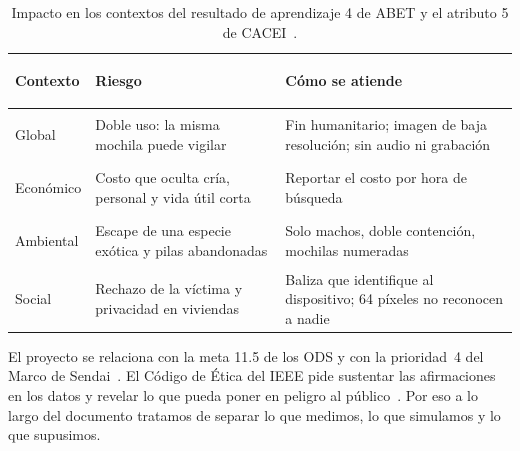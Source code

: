 \begin{table}[!htb]
\centering\footnotesize
\caption{Impacto en los contextos del resultado de aprendizaje 4 de ABET y el atributo 5 de
CACEI~\cite{abet,cacei}.}
\label{tab:impacto}
\begin{tabularx}{\textwidth}{@{}>{\bfseries\raggedright\arraybackslash}p{1.9cm} >{\raggedright\arraybackslash}X >{\raggedright\arraybackslash}X@{}}
\toprule
\rowcolor{TableHead} Contexto & Riesgo & Cómo se atiende \\
\midrule
Global & Doble uso: la misma mochila puede vigilar & Fin humanitario; imagen de baja resolución; sin audio ni grabación \\
Económico & Costo que oculta cría, personal y vida útil corta & Reportar el costo por hora de búsqueda \\
Ambiental & Escape de una especie exótica y pilas abandonadas & Solo machos, doble contención, mochilas numeradas \\
Social & Rechazo de la víctima y privacidad en viviendas & Baliza que identifique al dispositivo; 64 píxeles no reconocen a nadie \\
\bottomrule
\end{tabularx}
\end{table}

El proyecto se relaciona con la meta 11.5 de los ODS y con la prioridad~4 del Marco de Sendai~\cite{ods,sendai}. El Código de
Ética del IEEE pide sustentar las afirmaciones en los datos y revelar lo que pueda poner en peligro al
público~\cite{ieeecode}. Por eso a lo largo del documento tratamos de separar lo que medimos, lo que simulamos y lo que
supusimos.
